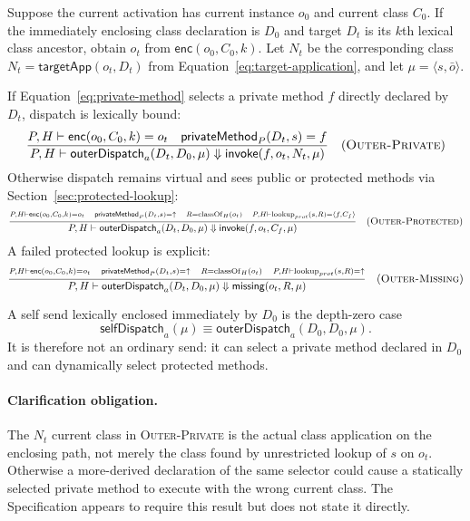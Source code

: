 \documentclass[11pt]{article}
\numberwithin{equation}{section}
\newcommand{\kw}[1]{\ensuremath{\mathsf{#1}}}
\newcommand{\undef}{\mathord{\uparrow}}
\newcommand{\classof}{\mathop{\mathrm{classOf}}}
\newcommand{\lookup}{\mathop{\mathrm{lookup}}}
\newcommand{\rulelabel}[1]{\textsc{#1}}
\begin{document}
Suppose the current activation has current instance $o_0$ and current class
$C_0$.  If the immediately enclosing class declaration is $D_0$ and target
$D_t$ is its $k$th lexical class ancestor, obtain $o_t$ from
$\mathsf{enc}(o_0,C_0,k)$.  Let $N_t$ be the corresponding class
$N_t=\mathsf{targetApp}(o_t,D_t)$ from
Equation~\eqref{eq:target-application}, and let
$\mu=\langle s,\bar o\rangle$.

If Equation~\eqref{eq:private-method} selects a private method $f$ directly
declared by $D_t$, dispatch is lexically bound:
\[
\dfrac{P,H\vdash\mathsf{enc}(o_0,C_0,k)=o_t\quad
       \mathsf{privateMethod}_P(D_t,s)=f}
      {P,H\vdash\mathsf{outerDispatch}_a(D_t,D_0,\mu)
       \Downarrow\kw{invoke}(f,o_t,N_t,\mu)}
\quad(\rulelabel{Outer-Private})
\]
Otherwise dispatch remains virtual and sees public or protected methods via
Section~\ref{sec:protected-lookup}:
{\small
\[
\dfrac{\substack{P,H\vdash\mathsf{enc}(o_0,C_0,k)=o_t\quad
       \mathsf{privateMethod}_P(D_t,s)=\undef\quad
       R=\classof_H(o_t)\quad
       P,H\vdash\lookup_{prot}(s,R)=\langle f,C_f\rangle}}
      {P,H\vdash\mathsf{outerDispatch}_a(D_t,D_0,\mu)
       \Downarrow\kw{invoke}(f,o_t,C_f,\mu)}
\quad(\rulelabel{Outer-Protected})
\]
}
A failed protected lookup is explicit:
\[
\dfrac{\substack{P,H\vdash\mathsf{enc}(o_0,C_0,k)=o_t\quad
       \mathsf{privateMethod}_P(D_t,s)=\undef\quad
       R=\classof_H(o_t)\quad
       P,H\vdash\lookup_{prot}(s,R)=\undef}}
      {P,H\vdash\mathsf{outerDispatch}_a(D_t,D_0,\mu)
       \Downarrow\kw{missing}(o_t,R,\mu)}
\quad(\rulelabel{Outer-Missing})
\]

A self send lexically enclosed immediately by $D_0$ is the depth-zero case
\begin{equation}\label{eq:self-send-derived}
  \mathsf{selfDispatch}_a(\mu)
    \equiv \mathsf{outerDispatch}_a(D_0,D_0,\mu).
\end{equation}
It is therefore not an ordinary send: it can select a private method declared
in $D_0$ and can dynamically select protected methods.

\paragraph{Clarification obligation.}
The $N_t$ current class in \rulelabel{Outer-Private} is the actual class
application on the enclosing path, not merely the class found by unrestricted
lookup of $s$ on $o_t$.  Otherwise a more-derived declaration of the same
selector could cause a statically selected private method to execute with the
wrong current class.  The Specification appears to require this result but does
not state it directly.
\end{document}
